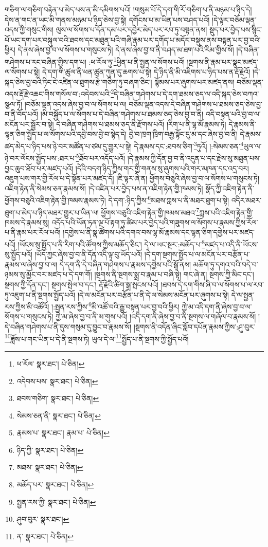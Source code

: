 གཅིག་ལ་གཅིག་བརྟེན་པ་མེད་པས་ན་མི་དམིགས་པའོ། །གསུམ་པོ་དེ་དག་གི་རོ་གཅིག་པ་ནི་མཉམ་པ་ཉིད་དེ། དེས་ན་གང་ན་ཡང་མི་གནས་མཉམ་པ་ཉིད་ཅེས་བྱ་སྟེ། དགོངས་པ་མ་ཡིན་པས་བཤད་པའོ། །དེ་ལྟར་བཅོམ་ལྡན་འདས་ཀྱི་གསུང་གིས། ལུས་ལ་སོགས་པ་དོན་དམ་པར་དབྱེར་མེད་པར་རབ་ཏུ་བསྟན་ནས། སྡུད་པར་བྱེད་པས་སྙིང་པོ་ཡང་དག་པར་བསྐུལ་བའི་ཐབས་དང་མཐུན་པའི་གཞི་རྣམ་པར་དགོད་པ་མདོར་བསྡུས་ནས་བསྟན་པར་བྱ་བའི་ཕྱིར། དེ་ནས་ཞེས་བྱ་བ་ལ་སོགས་པ་གསུངས་ཏེ། དེ་ནས་ཞེས་བྱ་བ་ནི་བཤད་མ་ཐག་པའི་རིམ་གྱིས་སོ། །དེ་བཞིན་གཤེགས་པ་རང་བཞིན་གྱིས་དག་པ། :ཕ་རོལ་ཏུ་\footnote{ཕ་རོལ་  སྣར་ཐང་།  པེ་ཅིན། }ཕྱིན་པ་ནི་སྤྱན་ལ་སོགས་པའོ། །སྔགས་ནི་རྣམ་པར་སྣང་མཛད་ལ་སོགས་པ་སྟེ། དེ་དག་གི་ཚུལ་ནི་ཕན་ཚུན་ཀུན་དུ་ཆགས་པ་སྟེ། དེ་ཉིད་ནི་མི་འཇིགས་པ་ཉིད་པས་ན་རྡོ་རྗེའོ། །དེ་སྐད་ཅེས་བྱ་བའི་ཏིང་ངེ་འཛིན་ལ་ཐུགས་རྩེ་གཅིག་ཏུ་བཞག་ཅིང་། སྙོམས་པར་ཞུགས་པར་མཛད་ནས། བཅོམ་ལྡན་འདས་རྡོ་རྗེ་འཆང་གིས་གསོལ་བ་:འདེབས་པའི་\footnote{འདེབས་པས་  སྣར་ཐང་།  པེ་ཅིན། }དེ་བཞིན་གཤེགས་པ་དེ་དག་ཐམས་ཅད་ལ་འདི་སྐད་ཅེས་བཀའ་སྩལ་ཏོ། །བཅོམ་ལྡན་འདས་ཞེས་བྱ་བ་ལ་སོགས་པ་ལ། བཅོམ་ལྡན་འདས་དེ་བཞིན་གཤེགས་པ་ཐམས་ཅད་ཅེས་བྱ་བ་ནི་བོད་པའོ། །མི་བསྐྱོད་པ་ལ་སོགས་པ་དེ་བཞིན་གཤེགས་པ་ཐམས་ཅད་ཅེས་བྱ་བ་ནི། འདི་བསྟན་པའི་བྱ་བ་ལ་མངོན་པར་སྦྱོར་བ་སྟེ། དེ་བཞིན་གཤེགས་པ་ཐམས་ཅད་ནི་རྫོགས་པའོ། །རིག་པ་ནི་ལྷ་མོ་རྣམས་ཏེ། དེ་རྣམས་ནི་ལྷན་ཅིག་སྤྱོད་པ་ལ་སོགས་པའི་དབྱེ་བས་བྱེ་བ་སྙེད་དེ། བྱེ་བ་ཁྲག་ཁྲིག་བརྒྱ་སྟོང་དུ་མ་དང་ཞེས་བྱ་བ་ནི། དེ་རྣམས་ཚད་མེད་པ་ཉིད་པས་ཉེ་བར་མཚོན་པ་ཙམ་དུ་གྱུར་པ་སྟེ། དེ་རྣམས་དང་:ཐབས་ཅིག་\footnote{ཐབས་གཅིག་  སྣར་ཐང་།  པེ་ཅིན། }ཏུའོ། །:སེམས་ཅན་\footnote{སེམས་ཅན་ནི་  སྣར་ཐང་།  པེ་ཅིན། }ཡུལ་ལ་ཉེ་བར་ལོངས་སྤྱོད་པས་:ཐར་པ་\footnote{རྣམས་པ་  སྣར་ཐང་། རྣམ་པ་  པེ་ཅིན། }ཐོབ་པར་འདོད་པའོ། །དེ་རྣམས་ཀྱི་དོན་བྱ་བ་ནི་འདུན་པ་དང་རྗེས་སུ་མཐུན་པས་བྱང་ཆུབ་ཐོབ་པར་མཛད་པའོ། །དེའི་བདག་ཉིད་ཀྱིས་གར་གྱི་གནས་སུ་ཞུགས་པའི་གར་མཁན་དང་འདྲ་བར། འཇུག་པས་གར་གྱི་རོལ་པ་དེ་སྟོན་པར་མཛད་དོ། །ཇི་ལྟར་ཞེ་ན། ཕྱོགས་བཅུའི་ཞེས་བྱ་བ་ལ་སོགས་པ་གསུངས་ཏེ། འཇིག་རྟེན་ནི་སེམས་ཅན་རྣམས་སོ། །དེ་འཛིན་པར་བྱེད་པས་ན་འཇིག་རྟེན་གྱི་ཁམས་ཏེ། སྣོད་ཀྱི་འཇིག་རྟེན་ནི་ཕྱོགས་བཅུའི་འཇིག་རྟེན་གྱི་ཁམས་རྣམས་ཏེ། དེ་དག་:ཉིད་ཀྱིས་\footnote{ཉིད་ཀྱི་  སྣར་ཐང་།  པེ་ཅིན། }མཐས་ཀླས་པ་ནི་མཐར་ཐུག་པ་སྟེ། འདིར་མཐར་ཐུག་པ་མེད་པ་ཉིད་མཐར་གྱུར་པ་ཡིན་ལ། ཕྱོགས་བཅུའི་འཇིག་རྟེན་གྱི་ཁམས་མཐའ་\footnote{མཐས་  སྣར་ཐང་།  པེ་ཅིན། }ཀླས་པའི་འཇིག་རྟེན་གྱི་ཁམས་དེ་རྣམས་སུ། འདོད་པའི་ཡོན་ཏན་ལྔ་པོ་རྟག་ཏུ་ཚིམ་པར་བྱེད་པའི་གཟུགས་ལ་སོགས་པ་རྣམས་ཀྱིས་རོལ་པ་ནི་རྣམ་པར་རོལ་པའོ། །དགྱེས་པ་ནི་སྣ་ཚོགས་པའི་དགའ་བས་ལྷ་མོ་རྣམས་དང་ལྷན་ཅིག་དགྱེས་པར་མཛད་པའོ། །ཡོངས་སུ་སྤྱོད་པ་ནི་རིག་པའི་ཚོགས་ཀྱིས་མཆོད་ཅིང་། དེ་ལ་ཡང་སྔར་:མཆོད་པ་\footnote{མཆོད་པར་  སྣར་ཐང་།  པེ་ཅིན། }མཛད་པ་འདི་ནི་ཡོངས་སུ་སྤྱོད་པའོ། །ཡོད་ཀྱང་ཞེས་བྱ་བ་ནི་དོན་འདི་ལྟ་བུ་ཡོད་པའོ། །དེ་དག་སྔགས་སྤྱོད་པ་ལ་མངོན་པར་བརྩོན་པ་རྣམས་ལ་ཞེས་བྱ་བ་ལ། དེ་དག་ནི་དེ་བཞིན་གཤེགས་པ་རྣམས་དགྱེས་པའི་སྒོ་ནས། མཆོག་ཏུ་དགའ་བའི་བདེ་བ་ཉམས་སུ་མྱོང་བར་མཛད་པ་དེ་དག་གོ། །སྔགས་ནི་སྔགས་སྨྲ་བ་རྣམ་པ་བཞི་སྟེ། གང་ཞེ་ན། སྔགས་ཀྱི་མིང་དང་། སྔགས་ཀྱི་དོན་དང་། སྔགས་སྤེལ་བ་དང་། རྡོ་རྗེའི་ཚིག་སྒྲ་སྤངས་པའོ། །ཐབས་དེ་དག་གིས་ཞི་བ་ལ་སོགས་པ་ལ་རབ་ཏུ་འཇུག་པ་ནི་སྔགས་སྤྱོད་པའོ། །དེ་ལ་མངོན་པར་བརྩོན་པ་ནི་དེ་ལ་སེམས་མངོན་པར་ཞུགས་པ་སྟེ། དེ་ལ་སྤྱན་རས་ཀྱིས་མི་འཚོའོ། །:སྤྱན་རས་ཀྱིས་\footnote{སྤྱན་རས་ཀྱི་  སྣར་ཐང་།  པེ་ཅིན། }མི་འཚོ་བའི་རྒྱུ་བསྟན་པར་བྱ་བའི་ཕྱིར། ཀྱེ་མ་འདི་དག་ནི་ཞེས་བྱ་བ་ལ་སོགས་པ་གསུངས་ཏེ། ཀྱེ་མ་ཞེས་བྱ་བ་ནི་མ་གུས་པའོ། །འདི་དག་ནི་ཞེས་བྱ་བ་ནི་སྔགས་ལ་གཞོལ་བ་རྣམས་སོ། །དེ་བཞིན་གཤེགས་པ་ནི་དུས་གསུམ་དུ་བྱུང་བ་རྣམས་སོ། །སྔགས་ནི་འདོན་ཞིང་སློབ་དཔོན་རྣམས་ཀྱིས་:ཤུ་བུར་\footnote{ཤུབ་བུར་  སྣར་ཐང་། }ཟློས་པ་གང་ཡིན་པ་དེ་ནི་སྔགས་ཏེ། ཡུལ་དེ་ལ་\footnote{ན་  སྣར་ཐང་།  པེ་ཅིན། }སྤྱོད་པ་ནི་སྔགས་ཀྱི་སྤྱོད་པའོ། 